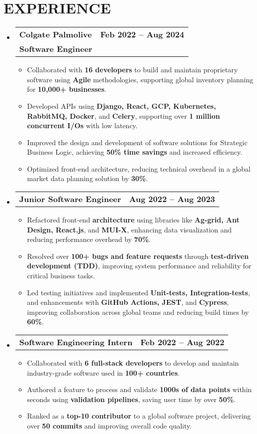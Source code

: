 \documentclass[letterpaper,10pt]{article}
\makeatletter
\newcommand{\resumeItem}[1]{
  \item\small{
    {#1 \vspace{-2pt}}
  }
}
\newcommand{\resumeSubheading}[4]{
  \vspace{2pt}\item
    \begin{tabular*}{1.0\textwidth}[t]{l@{\extracolsep{\fill}}r}
      \textbf{\large#1} & \textbf{\normalsize #2} \\
      \textbf{\normalsize#3} & \textbf{\small #4} \\
    \end{tabular*}\vspace{-7pt}
}
\newcommand{\resumeSubSubheading}[2]{
  \vspace{-6pt}\item
    \begin{tabular*}{1.0\textwidth}[t]{l@{\extracolsep{\fill}}r}
      \textbf{\normalsize#1} & \textbf{\small #2} \\
    \end{tabular*}\vspace{-7pt}
}
\newcommand{\resumeSubHeadingListStart}{\begin{itemize}[leftmargin=0.0in, label={}]}
\newcommand{\resumeSubHeadingListEnd}{\end{itemize}}
\newcommand{\resumeItemListStart}{\begin{itemize}}
\newcommand{\resumeItemListEnd}{\end{itemize}\vspace{-5pt}}
\makeatother
\begin{document}
\section{EXPERIENCE}
\resumeSubHeadingListStart
  \resumeSubheading{Colgate Palmolive 
  \href{https://drive.google.com/file/d/1Bn6h0GvFtkDxE25o8SCpva6-QOglHDiO/view?usp=drive_link}{\raisebox{-0.1\height}\faExternalLink}
  }{Feb 2022 -- Aug 2024}
  {Software Engineer}{}
  \resumeItemListStart
    \resumeItem{\normalsize{Collaborated with \textbf{16 developers} to build and maintain proprietary software using \textbf{Agile} methodologies, supporting global inventory planning for \textbf{10,000+ businesses}.}}
    \resumeItem{\normalsize{Developed APIs using \textbf{Django, React, GCP, Kubernetes, RabbitMQ, Docker}, and \textbf{Celery}, supporting over \textbf{1 million concurrent I/Os} with low latency.}}
    \resumeItem{\normalsize{Improved the design and development of software solutions for Strategic Business Logic, achieving \textbf{50\% time savings} and increased efficiency.}}
    \resumeItem{\normalsize{Optimized front-end architecture, reducing technical overhead in a global market data planning solution by \textbf{30\%}.}}
  \resumeItemListEnd
  \resumeSubSubheading{Junior Software Engineer}{Aug 2022 -- Aug 2023}
  \resumeItemListStart
    \resumeItem{\normalsize{Refactored front-end \textbf{architecture} using libraries like \textbf{Ag-grid, Ant Design, React.js}, and \textbf{MUI-X}, enhancing data visualization and reducing performance overhead by \textbf{70\%}.}}
    \resumeItem{\normalsize{Resolved over \textbf{100+ bugs and feature requests} through \textbf{test-driven development (TDD)}, improving system performance and reliability for critical business tasks.}}
    \resumeItem{\normalsize{Led testing initiatives and implemented \textbf{Unit-tests, Integration-tests}, and enhancements with \textbf{GitHub Actions, JEST}, and \textbf{Cypress}, improving collaboration across global teams and reducing build times by \textbf{60\%}.}}
  \resumeItemListEnd
  \resumeSubSubheading{Software Engineering Intern}{Feb 2022 -- Aug 2022}
  \resumeItemListStart
    \resumeItem{\normalsize{Collaborated with \textbf{6 full-stack developers} to develop and maintain industry-grade software used in \textbf{100+ countries}.}}
    \resumeItem{\normalsize{Authored a feature to process and validate \textbf{1000s of data points} within seconds using \textbf{validation pipelines}, saving user time by over \textbf{50\%}.}}
    \resumeItem{\normalsize{Ranked as a \textbf{top-10 contributor} to a global software project, delivering over \textbf{50 commits} and improving overall code quality.}}
  \resumeItemListEnd
\resumeSubHeadingListEnd
\vspace{-12pt}
\end{document}
